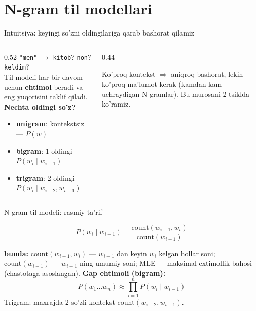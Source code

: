 \documentclass[aspectratio=169,11pt]{beamer}
\newcommand{\bunda}[1]{{\small\textbf{bunda:}\; #1}}
\begin{document}
\section[N-gram]{N-gram til modellari}

\begin{frame}{Intuitsiya: keyingi so'zni oldingilariga qarab bashorat qilamiz}
  \begin{columns}[T]
    \begin{column}{0.52\textwidth}
      \small
      \texttt{"men"} $\to$ \texttt{kitob}? \texttt{non}? \texttt{keldim}?\\[4pt]
      Til modeli har bir davom uchun \textbf{ehtimol} beradi va eng yuqorisini
      taklif qiladi.\\[6pt]
      \textbf{Nechta oldingi so'z?}
      \begin{itemize}\setlength\itemsep{1pt}
        \item \textbf{unigram}: kontekstsiz --- $P(w)$
        \item \textbf{bigram}: 1 oldingi --- $P(w_i{\mid}w_{i-1})$
        \item \textbf{trigram}: 2 oldingi --- $P(w_i{\mid}w_{i-2},w_{i-1})$
      \end{itemize}
    \end{column}
    \begin{column}{0.44\textwidth}
      \begin{tcolorbox}[okbox,top=2pt,bottom=2pt]
        \footnotesize
        Ko'proq kontekst $\Rightarrow$ aniqroq bashorat, lekin
        ko'proq ma'lumot kerak (kamdan-kam uchraydigan N-gramlar).
        Bu murosani 2-tsiklda ko'ramiz.
      \end{tcolorbox}
    \end{column}
  \end{columns}
\end{frame}

\begin{frame}{N-gram til modeli: rasmiy ta'rif}
  \begin{tcolorbox}[defbox,title=Ta'rif: bigram ehtimoli (MLE)]
    \vspace{-0.4em}
    $$ P(w_i \mid w_{i-1}) = \frac{\text{count}(w_{i-1}, w_i)}{\text{count}(w_{i-1})} $$
  \end{tcolorbox}
  \vspace{3pt}
  \bunda{$\text{count}(w_{i-1},w_i)$ --- $w_{i-1}$ dan keyin $w_i$ kelgan
  hollar soni; $\text{count}(w_{i-1})$ --- $w_{i-1}$ ning umumiy soni;
  MLE --- maksimal extimollik bahosi (chastotaga asoslangan).}
  \vspace{5pt}
  \textbf{Gap ehtimoli (bigram):}
  $$ P(w_1 \ldots w_n) \approx \prod_{i=1}^{n} P(w_i \mid w_{i-1}) $$
  \footnotesize Trigram: maxrajda 2 so'zli kontekst
  $\text{count}(w_{i-2},w_{i-1})$.
\end{frame}
\end{document}
